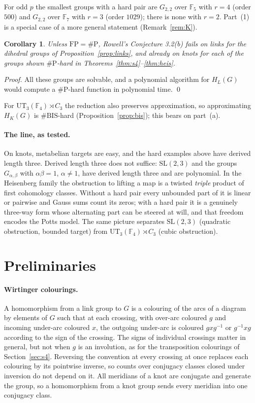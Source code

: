 \documentclass[11pt]{article}
\newtheorem{corollary}[theorem]{Corollary}
\theoremstyle{definition}
\theoremstyle{remark}
\newcommand{\F}{\mathbb{F}}
\newcommand{\sharpP}{\#\mathrm{P}}
\newcommand{\FP}{\mathrm{FP}}
\begin{document}
For odd $p$ the smallest groups with a hard pair are $G_{2,2}$ over $\F_5$ with
$r=4$ (order $500$) and $G_{2,2}$ over $\F_7$ with $r=3$ (order $1029$); there is
none with $r=2$. Part~(1) is a special case of a more general statement
(Remark~\ref{rem:K}).

\begin{corollary}\label{cor:rowell}
Unless $\FP=\sharpP$, Rowell's Conjecture 3.2(b) fails on links for the
dihedral groups of Proposition~\ref{prop:links}, and already on knots for each of
the groups shown $\sharpP$-hard in Theorems~\ref{thm:s4}--\ref{thm:heis}.
\end{corollary}

\noindent\emph{Proof.} All these groups are solvable, and a polynomial
algorithm for $H_L(G)$ would compute a $\sharpP$-hard function in
polynomial time. \qed

\smallskip
For $\mathrm{UT}_3(\F_4)\rtimes C_3$ the reduction also preserves
approximation, so approximating $H_K(G)$ is $\#\mathrm{BIS}$-hard
(Proposition~\ref{prop:bis}); this bears on part~(a).

\paragraph{The line, as tested.} On knots, metabelian targets are easy, and
the hard examples above have derived length three. Derived length three does
not suffice: $\mathrm{SL}(2,3)$ and the groups $G_{\alpha,\beta}$ with
$\alpha\beta=1$, $\alpha\ne1$, have derived length three and are polynomial.
In the Heisenberg family the obstruction to lifting a map is a twisted
\emph{triple} product of first cohomology classes. Without a hard pair every
unbounded part of it is linear or pairwise and Gauss sums count its zeros;
with a hard pair it is a genuinely three-way form whose alternating part can be
steered at will, and that freedom encodes the Potts model. The same picture
separates $\mathrm{SL}(2,3)$ (quadratic obstruction, bounded target) from
$\mathrm{UT}_3(\F_4)\rtimes C_3$ (cubic obstruction).

\section{Preliminaries}\label{sec:prelim}

\paragraph{Wirtinger colourings.} A homomorphism from a link group to $G$ is a
colouring of the arcs of a diagram by elements of $G$ such that at each
crossing, with over-arc coloured $g$ and incoming under-arc coloured $x$, the
outgoing under-arc is coloured $gxg^{-1}$ or $g^{-1}xg$ according to the sign
of the crossing. The signs of individual crossings matter in general, but not
when $g$ is an involution, as for the transposition colourings of
Section~\ref{sec:s4}. Reversing the convention at every crossing at once
replaces each colouring by its pointwise inverse, so counts over conjugacy
classes closed under inversion do not depend on it. All meridians of a knot are conjugate and generate the group, so a
homomorphism from a knot group sends every meridian into one conjugacy class.
\end{document}
